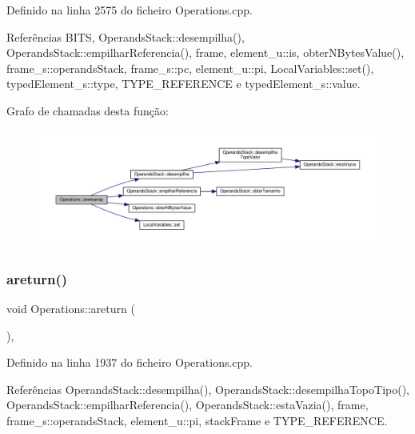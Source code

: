 Definido na linha 2575 do ficheiro Operations.\+cpp.



Referências B\+I\+TS, Operands\+Stack\+::desempilha(), Operands\+Stack\+::empilhar\+Referencia(), frame, element\+\_\+u\+::is, obter\+N\+Bytes\+Value(), frame\+\_\+s\+::operands\+Stack, frame\+\_\+s\+::pc, element\+\_\+u\+::pi, Local\+Variables\+::set(), typed\+Element\+\_\+s\+::type, T\+Y\+P\+E\+\_\+\+R\+E\+F\+E\+R\+E\+N\+CE e typed\+Element\+\_\+s\+::value.

Grafo de chamadas desta função\+:\nopagebreak
\begin{figure}[H]
\begin{center}
\leavevmode
\includegraphics[width=350pt]{classOperations_aa5110e66aa565e9130be292935ef5c71_cgraph}
\end{center}
\end{figure}
\mbox{\label{classOperations_a5829421b72f92d50dea0461953b26c5b}} 
\subsubsection{\texorpdfstring{areturn()}{areturn()}}
{\footnotesize\ttfamily void Operations\+::areturn (\begin{DoxyParamCaption}{ }\end{DoxyParamCaption})\hspace{0.3cm}{\ttfamily [static]}, {\ttfamily [private]}}



Definido na linha 1937 do ficheiro Operations.\+cpp.



Referências Operands\+Stack\+::desempilha(), Operands\+Stack\+::desempilha\+Topo\+Tipo(), Operands\+Stack\+::empilhar\+Referencia(), Operands\+Stack\+::esta\+Vazia(), frame, frame\+\_\+s\+::operands\+Stack, element\+\_\+u\+::pi, stack\+Frame e T\+Y\+P\+E\+\_\+\+R\+E\+F\+E\+R\+E\+N\+CE.

